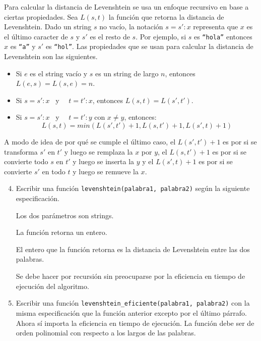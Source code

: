 \documentclass[a4paper,12pt]{book}
\theoremstyle{definition}
\begin{document}
	Para calcular la distancia de Levenshtein se usa un enfoque recursivo en base a ciertas propiedades. Sea $L(s,t)$ la función que retorna la distancia de Levenshtein. Dado un string $s$ no vacío, la notación $s=s'{:}x$ representa que $x$ es el último caracter de $s$  y $s'$ es el resto de $s$. Por ejemplo, si $s$ es {\tt ``hola''} entonces $x$ es {\tt ``a''} y $s'$ es {\tt ``hol''}. Las propiedades que se usan para calcular la distancia de Levenshtein son las siguientes.
	\begin{itemize}
		\item Si $e$ es el string vacío y $s$ es un string de largo $n$, entonces $L(e,s)=L(s,e)=n$.
		\item Si $s=s'{:}x$ ~y~~ $t=t'{:}x$, entonces $L(s,t)=L(s',t')$.
		\item Si $s=s'{:}x$ ~y~~ $t=t'{:}y$ con $x\not=y$, entonces:
		$$L(s,t) = min(L(s',t')+1,L(s,t')+1,L(s',t)+1)
		$$
	\end{itemize}
	A modo de idea de por qué se cumple el último caso, el $L(s',t')+1$ es por si se transforma $s'$ en $t'$ y luego se remplaza la $x$ por $y$, el $L(s,t')+1$ es por si se convierte todo $s$ en $t'$ y luego se inserta la $y$ y el $L(s',t)+1$ es por si se convierte $s'$ en todo $t$ y luego se remueve la $x$.
	
	\begin{enumerate}
		\setcounter{enumi}{3}
		\item Escribir una función {\tt levenshtein(palabra1, palabra2)} según la siguiente especificación.
		
		Los dos parámetros son strings.
		
		La función retorna un entero.
		
		El entero que la función retorna es la distancia de Levenshtein entre las dos palabras.
		
		Se debe hacer por recursión sin preocuparse por la eficiencia en tiempo de ejecución del algoritmo.
		
		\item Escribir una función {\tt levenshtein\_eficiente(palabra1, palabra2)} con la misma especificación que la función anterior excepto por el último párrafo. Ahora sí importa la eficiencia en tiempo de ejecución. La función debe ser de orden polinomial con respecto a los largos de las palabras.
	\end{enumerate}
	
\end{document}
